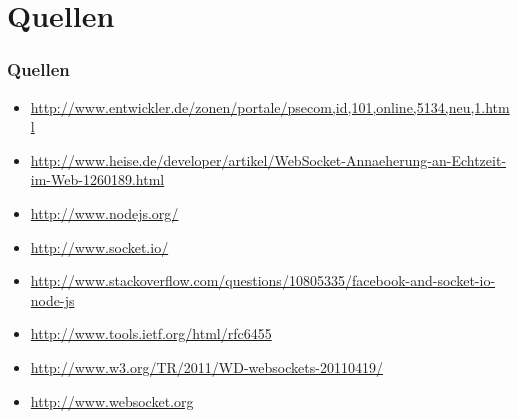 \documentclass{beamer}
\begin{document}
\section{Quellen}
\begin{frame}
\frametitle{Quellen}
\begin{itemize}
\item \url{http://www.entwickler.de/zonen/portale/psecom,id,101,online,5134,neu,1.html}
\item \url{http://www.heise.de/developer/artikel/WebSocket-Annaeherung-an-Echtzeit-im-Web-1260189.html}
\item \url{http://www.nodejs.org/}
\item \url{http://www.socket.io/}
\item \url{http://www.stackoverflow.com/questions/10805335/facebook-and-socket-io-node-js}
\item \url{http://www.tools.ietf.org/html/rfc6455}
\item \url{http://www.w3.org/TR/2011/WD-websockets-20110419/}
\item \url{http://www.websocket.org}
\end{itemize}
\end{frame}
\end{document}
